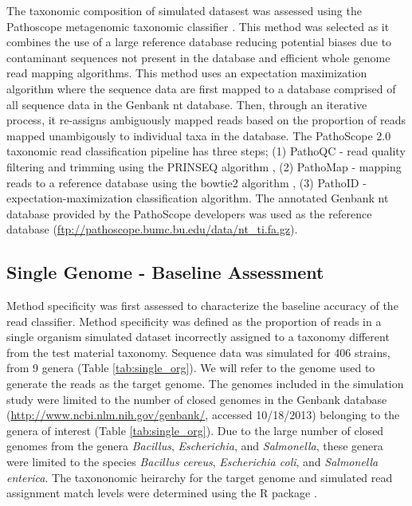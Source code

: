\documentclass[fleqn,10pt,lineno]{wlpeerj}\usepackage[]{graphicx}\usepackage[]{color}
\begin{document}
The taxonomic composition of simulated datasest was assessed using the Pathoscope metagenomic taxonomic classifier \citep{Francis2013}. 
This method was selected as it combines the use of a large reference database reducing potential biases due to contaminant sequences not present in the database and efficient whole genome read mapping algorithms. 
This method uses an expectation maximization algorithm where the sequence data are first mapped to a database comprised of all sequence data in the Genbank nt database. 
Then, through an iterative process, it re-assigns ambiguously mapped reads based on the proportion of reads mapped unambigously to individual taxa in the database. 
The PathoScope 2.0 taxonomic read classification pipeline has three steps; (1) PathoQC - read quality filtering and trimming using the PRINSEQ algorithm \citep{schmieder2011quality}, (2) PathoMap - mapping reads to a reference database using the bowtie2 algorithm \citep{Langmead2012}, (3) PathoID - expectation-maximization classification algorithm. 
The annotated Genbank nt database provided by the PathoScope developers was used as the reference database (\url{ftp://pathoscope.bumc.bu.edu/data/nt\_ti.fa.gz}).

\subsection*{Single Genome - Baseline Assessment}
Method specificity was first assessed to characterize the baseline accuracy of the read classifier.
Method specificity was defined as the proportion of reads in a single organism simulated dataset incorrectly assigned to a taxonomy different from the test material taxonomy. 
Sequence data was simulated for 406 strains, from 9 genera (Table \ref{tab:single_org}). 
We will refer to the genome used to generate the reads as the target genome. 
The genomes included in the simulation study were limited to the number of closed genomes in the Genbank database (\url{http://www.ncbi.nlm.nih.gov/genbank/}, accessed 10/18/2013) belonging to the genera of interest (Table \ref{tab:single_org}). 
Due to the large number of closed genomes from the genera \textit{Bacillus}, \textit{Escherichia}, and \textit{Salmonella}, these genera were limited to the species \textit{Bacillus cereus}, \textit{Escherichia coli}, and \textit{Salmonella enterica}.
The taxononomic heirarchy for the target genome and simulated read assignment match levels were determined using the R package \citep{TaxizeArticle,TaxizeManual}. 
\end{document}
